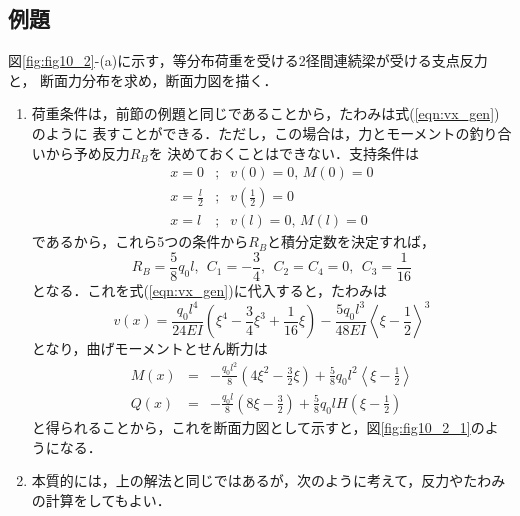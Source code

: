 \documentclass[10pt,a4j]{jarticle}
\begin{document}
\subsection{例題}
図\ref{fig:fig10_2}-(a)に示す，等分布荷重を受ける2径間連続梁が受ける支点反力と，
断面力分布を求め，断面力図を描く．
\begin{enumerate}
\item
荷重条件は，前節の例題と同じであることから，たわみは式(\ref{eqn:vx_gen})のように
表すことができる．ただし，この場合は，力とモーメントの釣り合いから予め反力$R_B$を
決めておくことはできない．支持条件は
\begin{eqnarray}
	x=0 &;& v(0)=0, \, M(0)=0 
	\label{eqn:BC_0}
	\\
	x=\frac{l}{2} &;& v\left( \frac{1}{2} \right)=0
	\label{eqn:BC_l2}
	\\
	x=l &;& v(l)=0, \, M(l)=0
	\label{eqn:BC_l}
\end{eqnarray}
であるから，これら5つの条件から$R_B$と積分定数を決定すれば，
\begin{equation}
	R_B=\frac{5}{8}q_0l, \ \ C_1=-\frac{3}{4}, \ \ C_2=C_4=0, \ \ C_3=\frac{1}{16}
\end{equation}
となる．これを式(\ref{eqn:vx_gen})に代入すると，たわみは
\begin{equation}
	v(x)=\frac{q_0l^4}{24EI}\left( \xi^4-\frac{3}{4}\xi^3 +\frac{1}{16}\xi \right)
	-
	\frac{5q_0l^3}{48EI}\left< \xi-\frac{1}{2}\right>^3
\end{equation}
となり，曲げモーメントとせん断力は
\begin{eqnarray}
	M(x) &= & 
		-\frac{q_0l^2}{8}\left(4\xi^2 -\frac{3}{2}\xi \right)
		+
		\frac{5}{8}q_0l^2\left< \xi-\frac{1}{2}\right>
	\\
	Q(x) &= & 
		-\frac{q_0l}{8}\left(8\xi -\frac{3}{2} \right)
		+
		\frac{5}{8}q_0lH\left( \xi-\frac{1}{2}\right)
\end{eqnarray}
と得られることから，これを断面力図として示すと，図\ref{fig:fig10_2_1}のようになる．
\item
本質的には，上の解法と同じではあるが，次のように考えて，反力やたわみの計算をしてもよい．


\end{enumerate}
\end{document}
